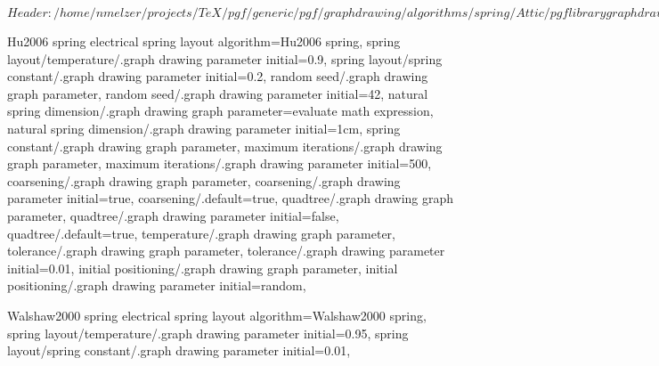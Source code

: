 %
%
%

\ProvidesFileRCS[v\pgfversion] $Header: /home/nmelzer/projects/TeX/pgf/generic/pgf/graphdrawing/algorithms/spring/Attic/pgflibrarygraphdrawing.spring.code.tex,v 1.6 2011/05/11 01:26:41 jannis-pohlmann Exp $





%
% 







%
%



%
% 
%
\pgfgddeclarealgorithmkey
  {Hu2006 spring electrical}
  {spring layout}
  {
    algorithm=Hu2006 spring,
    spring layout/temperature/.graph drawing parameter initial=0.9,
    spring layout/spring constant/.graph drawing parameter initial=0.2,
  }
  {
    random seed/.graph drawing graph parameter,
    random seed/.graph drawing parameter initial=42,
    natural spring dimension/.graph drawing graph parameter=evaluate math expression,
    natural spring dimension/.graph drawing parameter initial=1cm,
    spring constant/.graph drawing graph parameter,
    maximum iterations/.graph drawing graph parameter,
    maximum iterations/.graph drawing parameter initial=500,
    coarsening/.graph drawing graph parameter,
    coarsening/.graph drawing parameter initial=true,
    coarsening/.default=true,
    quadtree/.graph drawing graph parameter,
    quadtree/.graph drawing parameter initial=false,
    quadtree/.default=true,
    temperature/.graph drawing graph parameter,
    tolerance/.graph drawing graph parameter,
    tolerance/.graph drawing parameter initial=0.01,
    initial positioning/.graph drawing graph parameter,
    initial positioning/.graph drawing parameter initial=random,
  }



%
%
%
\pgfgddeclarealgorithmkey
  {Walshaw2000 spring electrical}
  {spring layout}
  {
    algorithm=Walshaw2000 spring,
    spring layout/temperature/.graph drawing parameter initial=0.95,
    spring layout/spring constant/.graph drawing parameter initial=0.01,
  }
  {}
